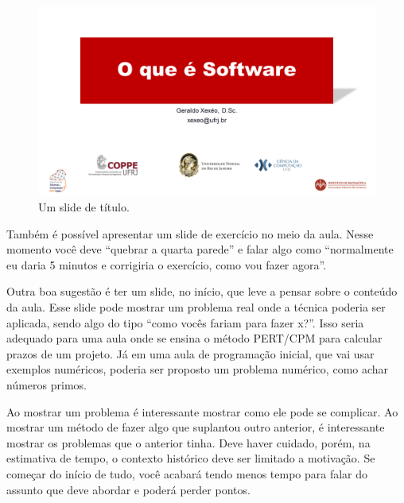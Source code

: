 \documentclass{article}
\def\tam{0.6}
\begin{document}
\begin{figure}[ht]
    \centering
    \includegraphics[width=\tam\linewidth]{imagens/capa.png}
    \caption{Um slide de título.}
    \label{fig:titulo}
\end{figure}

Também é possível apresentar um slide de exercício no meio da aula. Nesse momento você deve ``quebrar a quarta parede'' e falar algo como ``normalmente eu daria 5 minutos e corrigiria o exercício, como vou fazer agora''.

Outra boa sugestão é ter um slide, no início, que leve a pensar sobre o conteúdo da aula. Esse slide pode mostrar um problema real onde a técnica poderia ser aplicada, sendo algo do tipo ``como vocês fariam para fazer x?''. Isso seria adequado para uma aula onde se ensina o método PERT/CPM para calcular prazos de um projeto. Já em uma aula de programação inicial, que vai usar exemplos numéricos, poderia ser proposto um problema numérico, como achar números primos. 

Ao mostrar um problema é interessante mostrar como ele pode se complicar. Ao mostrar um método de fazer algo que suplantou outro anterior, é interessante mostrar os problemas que o anterior tinha. Deve haver cuidado, porém, na estimativa de tempo, o contexto histórico deve ser limitado a motivação. Se começar do início de tudo, você acabará tendo menos tempo para falar do assunto que deve abordar e poderá perder pontos.
\end{document}
